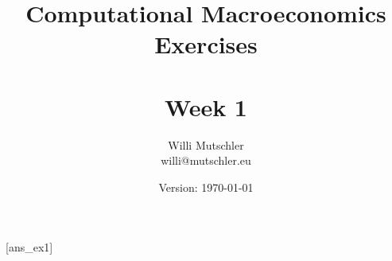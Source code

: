 
\newif\ifDisplaySolutions %


\title{Computational Macroeconomics\\Exercises\\~\\Week 1}
\author{Willi Mutschler\\willi@mutschler.eu}
\date{Version: \today}
\maketitle\thispagestyle{empty}

\newpage
{}[ans_ex1]
\tableofcontents\thispagestyle{empty}\newpage

\setcounter{page}{1}




%
%


\printbibliography
{}
\ifDisplaySolutions
\newpage
\appendix
\section{Solutions}

\fi
